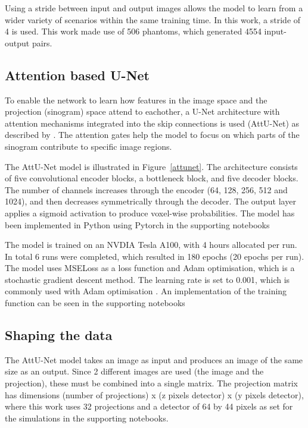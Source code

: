 \documentclass{article}
\begin{document}
Using a stride between input and output images allows the model to learn from a wider variety of scenarios within the same training time. In this work, a stride of 4 is used. This work made use of 506 phantoms, which generated 4554 input-output pairs.

\subsection{Attention based U-Net}

To enable the network to learn how features in the image space and the projection (sinogram) space attend to eachother, a U-Net architecture with attention mechanisms integrated into the skip connections is used (AttU-Net) as described by \citep{oktay2018attentionunet}. The attention gates help the model to focus on which parts of the sinogram contribute to specific image regions.

The AttU-Net model is illustrated in Figure~\ref{attunet}. The architecture consists of five convolutional encoder blocks, a bottleneck block, and five decoder blocks. The number of channels increases through the encoder (64, 128, 256, 512 and 1024), and then decreases symmetrically through the decoder. The output layer applies a sigmoid activation to produce voxel-wise probabilities. The model has been implemented in Python using Pytorch in the supporting notebooks

The model is trained on an NVDIA Tesla A100, with 4 hours allocated per run. In total 6 runs were completed, which resulted in 180 epochs (20 epochs per run). The model uses MSELoss as a loss function and Adam optimisation, which is a stochastic gradient descent method. The learning rate is set to 0.001, which is commonly used with Adam optimisation \citep{kingma2014adam}. An implementation of the training function can be seen in the supporting notebooks

\subsection{Shaping the data}

The AttU-Net model takes an image as input and produces an image of the same size as an output. Since 2 different images are used (the image and the projection), these must be combined into a single matrix. The projection matrix has dimensions (number of projections) x (z pixels detector) x (y pixels detector), where this work uses 32 projections and a detector of 64 by 44 pixels as set for the simulations in the supporting notebooks.
\end{document}
